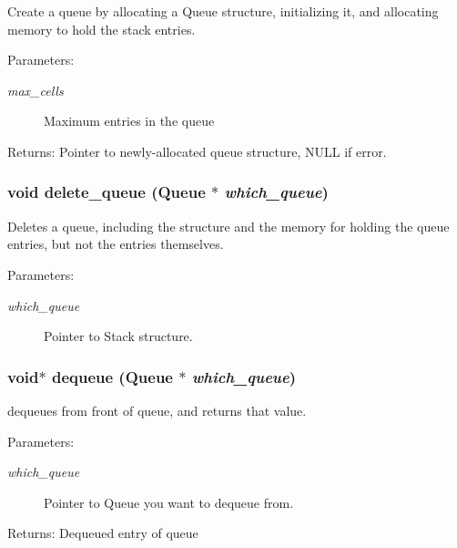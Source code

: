 Create a queue by allocating a Queue structure, initializing it, and allocating memory to hold the stack entries. \begin{Desc}
\item[Parameters:]
\begin{description}
\item[{\em max\_\-cells}]Maximum entries in the queue \end{description}
\end{Desc}
\begin{Desc}
\item[Returns:]Pointer to newly-allocated queue structure, NULL if error. \end{Desc}
\subsubsection{\setlength{\rightskip}{0pt plus 5cm}void delete\_\-queue (\bf{Queue} $\ast$ {\em which\_\-queue})}\label{queue_8c_b43c6f0104078cd018e97703f7b95ba7}


Deletes a queue, including the structure and the memory for holding the queue entries, but not the entries themselves. \begin{Desc}
\item[Parameters:]
\begin{description}
\item[{\em which\_\-queue}]Pointer to Stack structure. \end{description}
\end{Desc}
\subsubsection{\setlength{\rightskip}{0pt plus 5cm}void$\ast$ dequeue (\bf{Queue} $\ast$ {\em which\_\-queue})}\label{queue_8c_f8db386ebc4c0620589024d51d83f3b5}


dequeues from front of queue, and returns that value. \begin{Desc}
\item[Parameters:]
\begin{description}
\item[{\em which\_\-queue}]Pointer to Queue you want to dequeue from. \end{description}
\end{Desc}
\begin{Desc}
\item[Returns:]Dequeued entry of queue \end{Desc}
